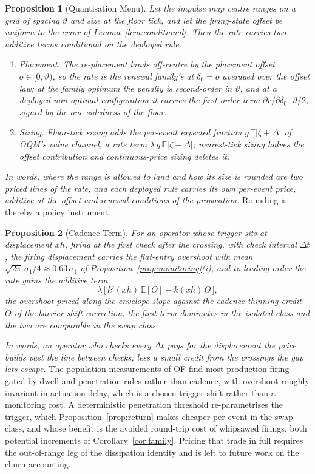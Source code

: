 \documentclass[11pt,a4paper]{article}
\theoremstyle{definition}
\theoremstyle{plain}
\newtheorem{proposition}{Proposition}
\theoremstyle{remark}
\begin{document}
\begin{proposition}[Quantisation Menu]\label{prop:menu}
Let the impulse map centre ranges on a grid of spacing $\vartheta$ and size at the floor tick, and let the firing-state offset be uniform to the error of Lemma~\ref{lem:conditional}. Then the 
rate carries two additive terms conditional on the deployed rule.
\begin{enumerate}[label=(\roman*)]
\item \emph{Placement.} The re-placement lands off-centre by the placement offset $o \in [0, \vartheta)$, so the rate is the renewal family's at $\delta_0 = o$ averaged over the offset law; at 
the family optimum the penalty is second-order in $\vartheta$, and at a deployed non-optimal configuration it carries the first-order term $\partial r/\partial \delta_0 \cdot \vartheta/2$, signed 
by the one-sidedness of the floor.
\item \emph{Sizing.} Floor-tick sizing adds the per-event expected fraction $g\,\mathbb{E}|\zeta + \Delta|$ of OQM's value channel, a rate term $\lambda\, g\,\mathbb{E}|\zeta + \Delta|$; nearest-tick 
sizing halves the offset contribution and continuous-price sizing deletes it.
\end{enumerate}
\end{proposition}

\emph{In words, where the range is allowed to land and how its size is rounded are two priced lines of the rate, and each deployed rule carries its own per-event price, additive at the offset and 
renewal conditions of the proposition.} Rounding is thereby a policy instrument.

\begin{proposition}[Cadence Term]\label{prop:cadence}
For an operator whose trigger sits at displacement $xh$, firing at the first check after the crossing, with check interval $\Delta t$, the firing displacement carries the flat-entry overshoot 
with mean $\sqrt{2\pi}\,\sigma_1/4 \approx
0.63\,\sigma_1$ of Proposition~\ref{prop:monitoring}(i), and to leading order the rate gains the additive term
\[
\lambda\,\big[\,k'(xh)\,\mathbb{E}[O]
- k(xh)\,\Theta\,\big],
\]
the overshoot priced along the envelope slope against the cadence thinning credit $\Theta$ of the barrier-shift correction; the first term dominates in the isolated class and the two are comparable 
in the swap class.
\end{proposition}

\emph{In words, an operator who checks every $\Delta t$ pays for the displacement the price builds past the line between checks, less a small credit from the crossings the gap lets escape.} 
The population measurements of OF find most production firing gated by dwell and penetration rules rather than cadence, with overshoot roughly invariant in actuation delay, which is a chosen 
trigger shift rather than a monitoring cost. A deterministic penetration threshold re-parametrises the trigger, which Proposition~\ref{prop:return} makes cheaper per event in the swap class, 
and whose benefit is the avoided round-trip cost of whipsawed firings, both potential increments of Corollary~\ref{cor:family}. Pricing that trade in full requires the out-of-range leg of the 
dissipation identity and is left to future work on the churn accounting.
\end{document}
